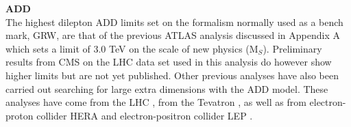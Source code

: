     {\bf ADD}\\
        The highest dilepton ADD limits set on the formalism normally used as a bench mark, GRW, are that of the previous ATLAS analysis \cite{PhysRevD.87.015010} discussed in Appendix A which sets a limit of 3.0 TeV on the scale of new physics (M$_{S}$). Preliminary results from CMS on the LHC data set used in this analysis do however show higher limits but are not yet published. Other previous analyses have also been carried out searching for large extra dimensions with the ADD model. These analyses have come from the LHC \cite{}, from the Tevatron \cite{}, as well as from electron-proton collider HERA \cite{} and electron-positron collider LEP \cite{}. 








